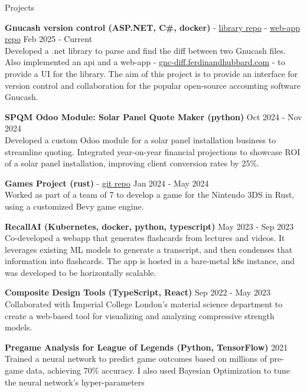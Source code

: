 \documentclass{resume} %
\begin{document}
\begin{rSection}{Projects}
\vspace{-1.25em}

\item \textbf{Gnucash version control (ASP.NET, C\#, docker)} - \href{https://github.com/ferdinandhubbard981/gnucash-diff}{library repo} - \href{https://github.com/ferdinandhubbard981/gnucash-version-control-web}{web-app repo} \hfill Feb 2025 - Current \\
Developed a .net library to parse and find the diff between two Gnucash files. Also implemented an api and a web-app - \href{https://gnc-diff.ferdinandhubbard.com}{gnc-diff.ferdinandhubbard.com} - to provide a UI for the library. The aim of this project is to provide an interface for version control and collaboration for the popular open-source accounting software Gnucash.

\item \textbf{SPQM Odoo Module: Solar Panel Quote Maker (python)} \hfill Oct 2024 - Nov 2024 \\
Developed a custom Odoo module for a solar panel installation business to streamline quoting. Integrated year-on-year financial projections to showcase ROI of a solar panel installation, improving client conversion rates by 25\%. 

\item \textbf{Games Project (rust)} - \href{https://github.com/Team-Yarg/these\_times\_of\_mine}{git repo} \hfill Jan 2024 - May 2024 \\
Worked as part of a team of 7 to develop a game for the Nintendo 3DS in Rust, using a customized Bevy game engine.

\item \textbf{RecallAI (Kubernetes, docker, python, typescript)} \hfill May 2023 - Sep 2023 \\
Co-developed a webapp that generates flashcards from lectures and videos. It leverages existing ML models to generate a transcript, and then condenses that information into flashcards. The app is hosted in a bare-metal k8s instance, and was developed to be horizontally scalable.

\item \textbf{Composite Design Tools (TypeScript, React)} \hfill Sep 2022 - May 2023 \\
Collaborated with Imperial College London's material science department to create a web-based tool for visualizing and analyzing compressive strength models.

\item \textbf{Pregame Analysis for League of Legends (Python, TensorFlow)} \hfill 2021 \\
Trained a neural network to predict game outcomes based on millions of pre-game data, achieving 70\% accuracy. I also used Bayesian Optimization to tune the neural network's hyper-parameters

\end{rSection}
\end{document}
